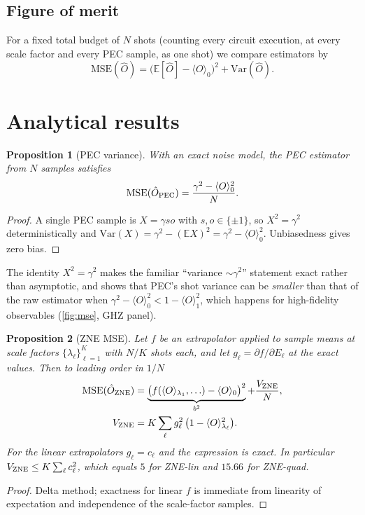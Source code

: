 \documentclass[aps,pra,reprint,amsmath,amssymb,nofootinbib,superscriptaddress]{revtex4-2}
\newtheorem{proposition}{Proposition}
\theoremstyle{remark}
\newcommand{\E}{\mathbb{E}}
\newcommand{\Var}{\mathrm{Var}}
\newcommand{\MSE}{\mathrm{MSE}}
\begin{document}
\subsection{Figure of merit}

For a fixed total budget of $N$ shots (counting every circuit execution, at every scale factor and every PEC sample, as one shot) we compare estimators by
\begin{equation}
\MSE(\hat O) = \big(\E[\hat O]-\langle O\rangle_0\big)^2+\Var(\hat O) .
\end{equation}

\section{Analytical results}
\label{sec:theory}

\begin{proposition}[PEC variance]
\label{prop:pec}
With an exact noise model, the PEC estimator from $N$ samples satisfies
\begin{equation}
\MSE(\hat O_{\rm PEC}) = \frac{\gamma^2-\langle O\rangle_0^2}{N}.
\end{equation}
\end{proposition}
\begin{proof}
A single PEC sample is $X=\gamma s o$ with $s,o\in\{\pm1\}$, so $X^2=\gamma^2$ deterministically and $\Var(X)=\gamma^2-(\E X)^2=\gamma^2-\langle O\rangle_0^2$. Unbiasedness gives zero bias.
\end{proof}
The identity $X^2=\gamma^2$ makes the familiar ``variance $\sim\gamma^2$'' statement exact rather than asymptotic, and shows that PEC's shot variance can be \emph{smaller} than that of the raw estimator when $\gamma^2-\langle O\rangle_0^2 < 1-\langle O\rangle_1^2$, which happens for high-fidelity observables (\cref{fig:mse}, GHZ panel).

\begin{proposition}[ZNE MSE]
\label{prop:zne}
Let $f$ be an extrapolator applied to sample means at scale factors $\{\lambda_\ell\}_{\ell=1}^K$ with $N/K$ shots each, and let $g_\ell=\partial f/\partial E_\ell$ at the exact values. Then to leading order in $1/N$
\begin{align}
\MSE(\hat O_{\rm ZNE}) &= \underbrace{\big(f(\langle O\rangle_{\lambda_1},\ldots)-\langle O\rangle_0\big)^2}_{b^2}
+\frac{V_{\rm ZNE}}{N},\nonumber\\
V_{\rm ZNE} &= K\sum_{\ell} g_\ell^2\,\big(1-\langle O\rangle_{\lambda_\ell}^2\big).
\label{eq:znemse}
\end{align}
For the linear extrapolators $g_\ell=c_\ell$ and the expression is exact. In particular $V_{\rm ZNE}\le K\sum_\ell c_\ell^2$, which equals $5$ for ZNE-lin and $15.66$ for ZNE-quad.
\end{proposition}
\begin{proof}
Delta method; exactness for linear $f$ is immediate from linearity of expectation and independence of the scale-factor samples.
\end{proof}
\end{document}
